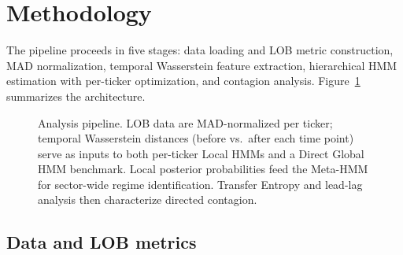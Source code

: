 \documentclass{article}
\begin{document}
\section{Methodology}
\label{sec:method}

The pipeline proceeds in five stages: data loading and LOB metric construction,
MAD normalization, temporal Wasserstein feature extraction, hierarchical HMM
estimation with per-ticker optimization, and contagion analysis.
Figure~\ref{fig:pipeline} summarizes the architecture.

\begin{figure}[H]
\centering
{}
\caption{Analysis pipeline. LOB data are MAD-normalized per ticker; temporal Wasserstein distances (before vs.\ after each time point) serve as inputs to both per-ticker Local HMMs and a Direct Global HMM benchmark. Local posterior probabilities feed the Meta-HMM for sector-wide regime identification. Transfer Entropy and lead-lag analysis then characterize directed contagion.}
\label{fig:pipeline}
\end{figure}

\subsection{Data and LOB metrics}
\end{document}
